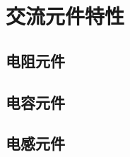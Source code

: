 

\section{交流元件特性}\label{21-2}

\subsection{电阻元件}\label{21-2-1}

\subsection{电容元件}\label{21-2-2}

\subsection{电感元件}\label{21-2-3}